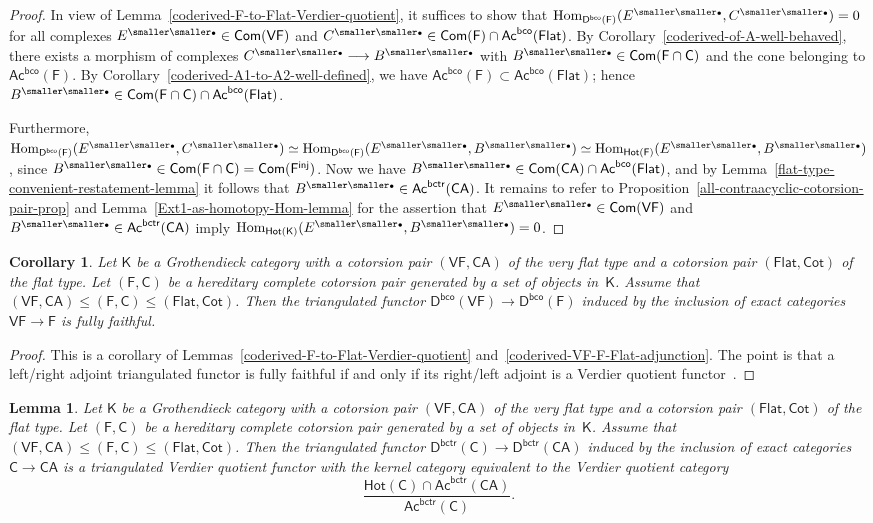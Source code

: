 \documentclass[12pt,a4paper]{amsart}
\newcommand{\+}{\nobreakdash-}
\renewcommand{\:}{\colon}
\newcommand{\rarrow}{\longrightarrow}
\newcommand{\bu}{{\text{\smaller\smaller$\scriptstyle\bullet$}}}
\DeclareMathOperator{\Hom}{Hom}
\newcommand{\sC}{\mathsf C}
\newcommand{\sD}{\mathsf D}
\newcommand{\sF}{\mathsf F}
\newcommand{\sK}{\mathsf K}
\newcommand{\VF}{\mathsf{VF}}
\newcommand{\CA}{\mathsf{CA}}
\newcommand{\Flat}{\mathsf{Flat}}
\newcommand{\Cot}{\mathsf{Cot}}
\newcommand{\Hot}{\mathsf{Hot}}
\newcommand{\Com}{\mathsf{Com}}
\newcommand{\Ac}{\mathsf{Ac}}
\newcommand{\inj}{\mathsf{inj}}
\newcommand{\bco}{\mathsf{bco}}
\newcommand{\bctr}{\mathsf{bctr}}
\theoremstyle{plain}
\newtheorem{lem}[thm]{Lemma}
\newtheorem{cor}[thm]{Corollary}
\theoremstyle{definition}
\begin{document}
\begin{proof}
 In view of Lemma~\ref{coderived-F-to-Flat-Verdier-quotient},
it suffices to show that $\Hom_{\sD^\bco(\sF)}(E^\bu,C^\bu)=0$
for all complexes $E^\bu\in\Com(\VF)$ and
$C^\bu\in\Com(\sF)\cap\Ac^\bco(\Flat)$.
 By Corollary~\ref{coderived-of-A-well-behaved}, there exists
a morphism of complexes $C^\bu\rarrow B^\bu$ with
$B^\bu\in\Com(\sF\cap\sC)$ and the cone belonging to $\Ac^\bco(\sF)$.
 By Corollary~\ref{coderived-A1-to-A2-well-defined}, we have
$\Ac^\bco(\sF)\subset\Ac^\bco(\Flat)$; hence
$B^\bu\in\Com(\sF\cap\sC)\cap\Ac^\bco(\Flat)$.

 Furthermore, $\Hom_{\sD^\bco(\sF)}(E^\bu,C^\bu)\simeq
\Hom_{\sD^\bco(\sF)}(E^\bu,B^\bu)\simeq\Hom_{\Hot(\sF)}(E^\bu,B^\bu)$,
since $B^\bu\in\Com(\sF\cap\sC)=\Com(\sF^\inj)$.
 Now we have $B^\bu\in\Com(\CA)\cap\Ac^\bco(\Flat)$, and
by Lemma~\ref{flat-type-convenient-restatement-lemma} it follows that
$B^\bu\in\Ac^\bctr(\CA)$.
 It remains to refer to
Proposition~\ref{all-contraacyclic-cotorsion-pair-prop}
and Lemma~\ref{Ext1-as-homotopy-Hom-lemma} for the assertion that
$E^\bu\in\Com(\VF)$ and $B^\bu\in\Ac^\bctr(\CA)$ imply
$\Hom_{\Hot(\sK)}(E^\bu,B^\bu)=0$.
\end{proof}

\begin{cor} \label{coderived-VF-to-F-fully-faithful}
 Let\/ $\sK$ be a Grothendieck category with a cotorsion pair
$(\VF,\CA)$ of the very flat type and a cotorsion pair $(\Flat,\Cot)$
of the flat type.
 Let $(\sF,\sC)$ be a hereditary complete cotorsion pair generated by
a set of objects in\/~$\sK$.
 Assume that $(\VF,\CA)\le(\sF,\sC)\le(\Flat,\Cot)$.
 Then the triangulated functor\/ $\sD^\bco(\VF)\rarrow\sD^\bco(\sF)$
induced by the inclusion of exact categories\/ $\VF\rarrow\sF$ is
fully faithful.
\end{cor}

\begin{proof}
 This is a corollary of
Lemmas~\ref{coderived-F-to-Flat-Verdier-quotient}
and~\ref{coderived-VF-F-Flat-adjunction}.
 The point is that a left/right adjoint triangulated functor is
fully faithful if and only if its right/left adjoint is a Verdier
quotient functor~\cite[Proposition~1.3]{GZ}.
\end{proof}

\begin{lem} \label{contraderived-C-to-CA-Verdier-quotient}
 Let\/ $\sK$ be a Grothendieck category with a cotorsion pair
$(\VF,\CA)$ of the very flat type and a cotorsion pair $(\Flat,\Cot)$
of the flat type.
 Let $(\sF,\sC)$ be a hereditary complete cotorsion pair generated by
a set of objects in\/~$\sK$.
 Assume that $(\VF,\CA)\le(\sF,\sC)\le(\Flat,\Cot)$.
 Then the triangulated functor\/ $\sD^\bctr(\sC)\rarrow\sD^\bctr(\CA)$
induced by the inclusion of exact categories\/ $\sC\rarrow\CA$ is
a triangulated Verdier quotient functor with the kernel category
equivalent to the Verdier quotient category
$$
 \frac{\Hot(\sC)\cap\Ac^\bctr(\CA)}{\Ac^\bctr(\sC)}.
$$
\end{lem}
\end{document}
